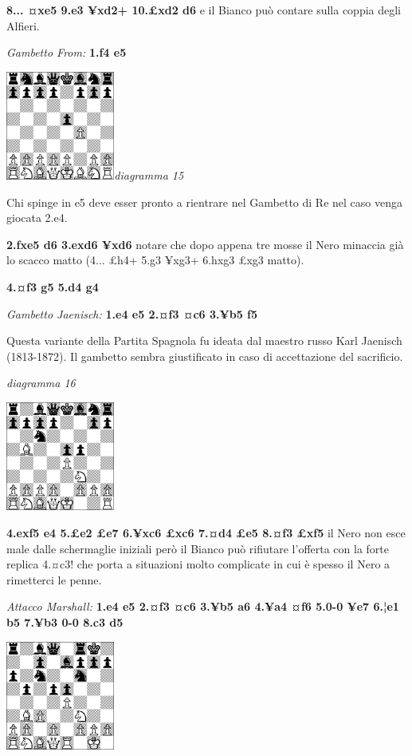 \documentclass[
]{article}
\begin{document}
\textbf{8... ¤xe5 9.e3 ¥xd2+ 10.£xd2 d6} e il Bianco può contare sulla
coppia degli Alfieri.

\emph{Gambetto From:} \textbf{1.f4 e5}

\includegraphics[width=1.40972in,height=1.40972in]{vertopal_109f12be458a423d8f3cc838880eaea2/media/image15.png}\emph{diagramma
15}

Chi spinge in e5 deve esser pronto a rientrare nel Gambetto di Re nel
caso venga giocata 2.e4.

\textbf{2.fxe5 d6 3.exd6 ¥xd6} notare che dopo appena tre mosse il Nero
minaccia già lo scacco matto (4... £h4+ 5.g3 ¥xg3+ 6.hxg3 £xg3 matto).

\textbf{4.¤f3 g5 5.d4 g4}

\emph{Gambetto Jaenisch:} \textbf{1.e4 e5 2.¤f3 ¤c6 3.¥b5 f5}

Questa variante della Partita Spagnola fu ideata dal maestro russo Karl
Jaenisch (1813-1872). Il gambetto sembra giustificato in caso di
accettazione del sacrificio.

\emph{diagramma 16}

\includegraphics[width=1.40972in,height=1.40972in]{vertopal_109f12be458a423d8f3cc838880eaea2/media/image16.png}

\textbf{4.exf5 e4 5.£e2 £e7 6.¥xc6 £xc6 7.¤d4 £e5 8.¤f3 £xf5} il Nero
non esce male dalle schermaglie iniziali però il Bianco può rifiutare
l'offerta con la forte replica 4.¤c3! che porta a situazioni molto
complicate in cui è spesso il Nero a rimetterci le penne.

\emph{Attacco Marshall:} \textbf{1.e4 e5 2.¤f3 ¤c6 3.¥b5 a6 4.¥a4 ¤f6
5.0-0 ¥e7 6.¦e1 b5 7.¥b3 0-0 8.c3 d5}

\includegraphics[width=1.40972in,height=1.40972in]{vertopal_109f12be458a423d8f3cc838880eaea2/media/image17.png}
\end{document}
